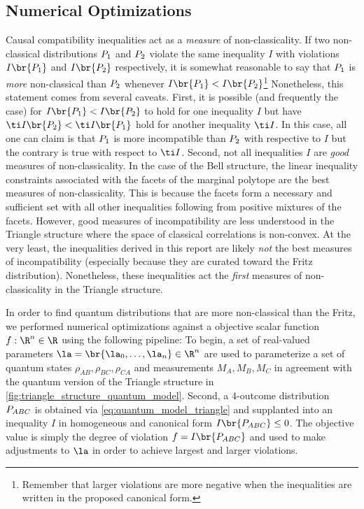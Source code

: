 \documentclass[aps, 10pt, english, twoside, pra, nofootinbib, tightenlines, longbibliography, superscriptaddress]{revtex4-1}
\begin{document}
    \subsection{Numerical Optimizations}
    \label{sec:optimizations}
    Causal compatibility inequalities act as a \textit{measure} of non-classicality. If two non-classical distributions $\prob[1]$ and $\prob[2]$ violate the same inequality $I$ with violations $I\br{\prob[1]}$ and $I\br{\prob[2]}$ respectively, it is somewhat reasonable to say that $\prob[1]$ is \textit{more} non-classical than $\prob[2]$ whenever ${I\br{\prob[1]}} < I\br{\prob[2]}$\footnote{Remember that larger violations are more negative when the inequalities are written in the proposed canonical form.} Nonetheless, this statement comes from several caveats. First, it is possible (and frequently the case) for ${I\br{\prob[1]}} < I\br{\prob[2]}$ to hold for one inequality $I$ but have ${\ti I\br{\prob[2]}} < \ti I\br{\prob[1]}$ hold for another inequality $\ti I$. In this case, all one can claim is that $\prob[1]$ is more incompatible than $\prob[2]$ with respective to $I$ but the contrary is true with respect to $\ti I$. Second, not all inequalities $I$ are \textit{good} measures of non-classicality. In the case of the Bell structure, the linear inequality constraints associated with the facets of the marginal polytope are the best measures of non-classicality. This is because the facets form a necessary and sufficient set with all other inequalities following from positive mixtures of the facets. However, good measures of incompatibility are less understood in the Triangle structure where the space of classical correlations is non-convex. At the very least, the inequalities derived in this report are likely \textit{not} the best measures of incompatibility (especially because they are curated toward the Fritz distribution). Nonetheless, these inequalities act the \textit{first} measures of non-classicality in the Triangle structure.

    In order to find quantum distributions that are more non-classical than the Fritz, we performed numerical optimizations against a objective scalar function $f: \R^n \in \R$ using the following pipeline: To begin, a set of real-valued parameters $\la = \br{\la_0, \ldots, \la_n} \in \R^{n}$ are used to parameterize a set of quantum states $\rho_{AB}, \rho_{BC}, \rho_{CA}$ and measurements $M_A, M_B, M_C$ in agreement with the quantum version of the Triangle structure in \cref{fig:triangle_structure_quantum_model}. Second, a $4$-outcome distribution $\prob[ABC]$ is obtained via \cref{eq:quantum_model_triangle} and supplanted into an inequality $I$ in homogeneous and canonical form $I\br{\prob[ABC]} \leq 0$. The objective value is simply the degree of violation $f = I\br{\prob[ABC]}$ and used to make adjustments to $\la$ in order to achieve largest and larger violations.
\end{document}
